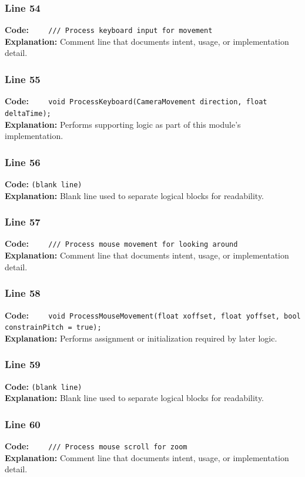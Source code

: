 \documentclass[11pt,a4paper]{article}
\begin{document}
\subsubsection*{Line 54}
\textbf{Code:} \verb|    /// Process keyboard input for movement|\\
\textbf{Explanation:} Comment line that documents intent, usage, or implementation detail.

\subsubsection*{Line 55}
\textbf{Code:} \verb|    void ProcessKeyboard(CameraMovement direction, float deltaTime);|\\
\textbf{Explanation:} Performs supporting logic as part of this module's implementation.

\subsubsection*{Line 56}
\textbf{Code:} \texttt{(blank line)}\\
\textbf{Explanation:} Blank line used to separate logical blocks for readability.

\subsubsection*{Line 57}
\textbf{Code:} \verb|    /// Process mouse movement for looking around|\\
\textbf{Explanation:} Comment line that documents intent, usage, or implementation detail.

\subsubsection*{Line 58}
\textbf{Code:} \verb|    void ProcessMouseMovement(float xoffset, float yoffset, bool constrainPitch = true);|\\
\textbf{Explanation:} Performs assignment or initialization required by later logic.

\subsubsection*{Line 59}
\textbf{Code:} \texttt{(blank line)}\\
\textbf{Explanation:} Blank line used to separate logical blocks for readability.

\subsubsection*{Line 60}
\textbf{Code:} \verb|    /// Process mouse scroll for zoom|\\
\textbf{Explanation:} Comment line that documents intent, usage, or implementation detail.
\end{document}
